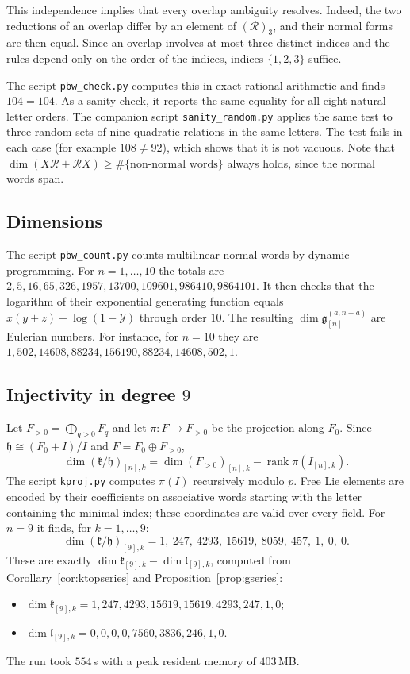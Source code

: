 \documentclass[11pt]{amsart}
\theoremstyle{definition}
\theoremstyle{remark}
\newcommand{\g}{\mathfrak{g}}
\newcommand{\h}{\mathfrak{h}}
\newcommand{\lie}{\mathfrak{l}}
\newcommand{\kr}{\mathfrak{k}}
\begin{document}
This independence implies that every overlap ambiguity resolves. Indeed, the two reductions of an overlap differ by an element of $(\mathcal R)_3$, and their normal forms are then equal. Since an overlap involves at most three distinct indices and the rules depend only on the order of the indices, indices $\{1,2,3\}$ suffice.

The script \texttt{pbw\_check.py} computes this in exact rational arithmetic and finds $104=104$. As a sanity check, it reports the same equality for all eight natural letter orders. The companion script \texttt{sanity\_random.py} applies the same test to three random sets of nine quadratic relations in the same letters. The test fails in each case (for example $108\ne92$), which shows that it is not vacuous. Note that $\dim(X\mathcal R+\mathcal RX)\ge\#\{\text{non-normal words}\}$ always holds, since the normal words span.

\subsection*{Dimensions}
The script \texttt{pbw\_count.py} counts multilinear normal words by dynamic programming. For $n=1,\dots,10$ the totals are $2,5,16,65,326,1957,13700,109601,986410,9864101$. It then checks that the logarithm of their exponential generating function equals $x(y+z)-\log(1-\mathcal Y)$ through order $10$. The resulting $\dim\g_{[n]}^{(a,n-a)}$ are Eulerian numbers. For instance, for $n=10$ they are $1,502,14608,88234,156190,88234,14608,502,1$.

\subsection*{Injectivity in degree $9$}
Let $F_{>0}=\bigoplus_{q>0}F_q$ and let $\pi\colon F\to F_{>0}$ be the projection along $F_0$. Since $\h\cong(F_0+I)/I$ and $F=F_0\oplus F_{>0}$,
\[
\dim(\kr/\h)_{[n],k}=\dim(F_{>0})_{[n],k}-\operatorname{rank}\pi(I_{[n],k}).
\]
The script \texttt{kproj.py} computes $\pi(I)$ recursively modulo $p$. Free Lie elements are encoded by their coefficients on associative words starting with the letter containing the minimal index; these coordinates are valid over every field. For $n=9$ it finds, for $k=1,\dots,9$:
\[
\dim(\kr/\h)_{[9],k}=1,\ 247,\ 4293,\ 15619,\ 8059,\ 457,\ 1,\ 0,\ 0.
\]
These are exactly $\dim\kr_{[9],k}-\dim\lie_{[9],k}$, computed from Corollary~\ref{cor:ktopseries} and Proposition~\ref{prop:gseries}:
\begin{itemize}
\item $\dim\kr_{[9],k}=1,247,4293,15619,15619,4293,247,1,0$;
\item $\dim\lie_{[9],k}=0,0,0,0,7560,3836,246,1,0$.
\end{itemize}
The run took $554$\,s with a peak resident memory of $403$\,MB.
\end{document}
